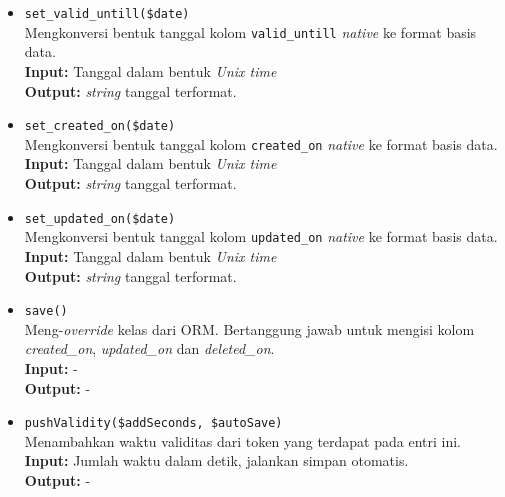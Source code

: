 \begin{itemize}
\begin{itemize}
                \item \texttt{set\_valid\_untill(\$date)} \\
                    Mengkonversi bentuk tanggal kolom \texttt{valid\_untill} \textit{native} ke 
                    format basis data. \\
                    \textbf{Input:} Tanggal dalam bentuk \textit{Unix time}\\
                    \textbf{Output:} \textit{string} tanggal terformat.
                    
                \item \texttt{set\_created\_on(\$date)} \\
                    Mengkonversi bentuk tanggal kolom \texttt{created\_on} \textit{native} ke 
                    format basis data. \\
                    \textbf{Input:} Tanggal dalam bentuk \textit{Unix time}\\
                    \textbf{Output:} \textit{string} tanggal terformat.
                
                \item \texttt{set\_updated\_on(\$date)} \\
                    Mengkonversi bentuk tanggal kolom \texttt{updated\_on} \textit{native} ke 
                    format basis data. \\
                    \textbf{Input:} Tanggal dalam bentuk \textit{Unix time}\\
                    \textbf{Output:} \textit{string} tanggal terformat.
                    
                    
                \item \texttt{save()}\\
                    Meng-\textit{override} kelas dari ORM. Bertanggung jawab untuk mengisi
                    kolom \textit{created\_on}, \textit{updated\_on} dan \textit{deleted\_on}.\\
                    \textbf{Input:} -\\
                    \textbf{Output:} -
                
                \item \texttt{pushValidity(\$addSeconds, \$autoSave)} \\
                    Menambahkan waktu validitas dari token yang terdapat pada entri ini. \\
                    \textbf{Input:} Jumlah waktu dalam detik, jalankan simpan otomatis.\\
                    \textbf{Output:} -
            \end{itemize}
    \end{itemize}

